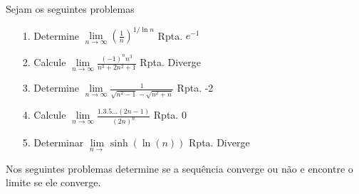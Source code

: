 Sejam os seguintes problemas


\begin{itemize}
	\item[1.] Determine $\lim\limits_{n\rightarrow \infty} (\frac{1}{n})^{1/\ln n} $ \quad \quad Rpta. $e^{-1}$
\end{itemize}
\begin{itemize}
	\item[2.] Calcule $\lim\limits_{n\rightarrow \infty} \frac{(-1)^{n}n^{3}}{n^{3}+2n^{2}+1}$ \quad \quad Rpta. Diverge
\end{itemize}
\begin{itemize}
	\item [3.] Determine $\lim\limits_{n\rightarrow \infty} \frac{1}{\sqrt{n^{2}-1}-\sqrt{n^{2}+n}}$ \quad \quad Rpta. -2
\end{itemize}
\begin{itemize}
	\item[4.] Calcule $\lim\limits_{n\rightarrow \infty} \frac{1.3.5...(2n-1)}{(2n)^{n}}$ \quad \quad Rpta. 0
\end{itemize}
\begin{itemize}
	\item[5.] Determinar $\lim\limits_{n\rightarrow } \sinh (\ln (n))$ \quad \quad Rpta. Diverge
\end{itemize}
Nos seguintes problemas determine se a sequência converge ou não e encontre o limite se ele converge. 


